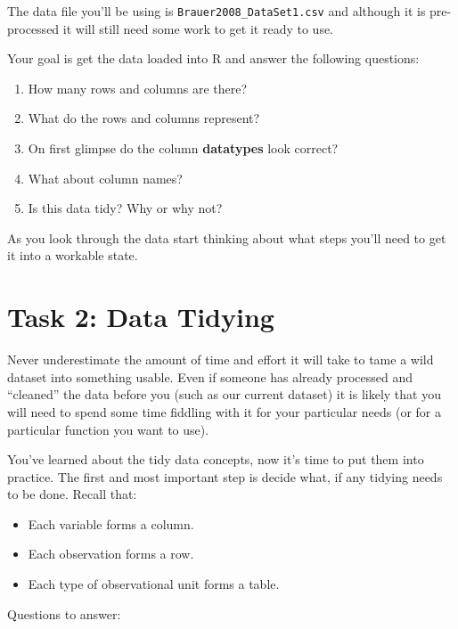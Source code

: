 \documentclass[
]{book}
\providecommand{\tightlist}{%
  \setlength{\itemsep}{0pt}\setlength{\parskip}{0pt}}
\begin{document}
The data file you'll be using is \texttt{Brauer2008\_DataSet1.csv} and although it is pre-processed it will still need some work to get it ready to use.

Your goal is get the data loaded into R and answer the following questions:

\begin{enumerate}
\def\labelenumi{\arabic{enumi}.}
\tightlist
\item
  How many rows and columns are there?
\item
  What do the rows and columns represent?
\item
  On first glimpse do the column \textbf{datatypes} look correct?
\item
  What about column names?
\item
  Is this data tidy? Why or why not?
\end{enumerate}

As you look through the data start thinking about what steps you'll need to get it into a workable state.

\hypertarget{task-2-data-tidying}{%
\section*{Task 2: Data Tidying}\label{task-2-data-tidying}}

Never underestimate the amount of time and effort it will take to tame a wild dataset into something usable. Even if someone has already processed and ``cleaned'' the data before you (such as our current dataset) it is likely that you will need to spend some time fiddling with it for your particular needs (or for a particular function you want to use).

You've learned about the tidy data concepts, now it's time to put them into practice. The first and most important step is decide what, if any tidying needs to be done. Recall that:

\begin{itemize}
\tightlist
\item
  Each variable forms a column.
\item
  Each observation forms a row.
\item
  Each type of observational unit forms a table.
\end{itemize}

Questions to answer:
\end{document}
